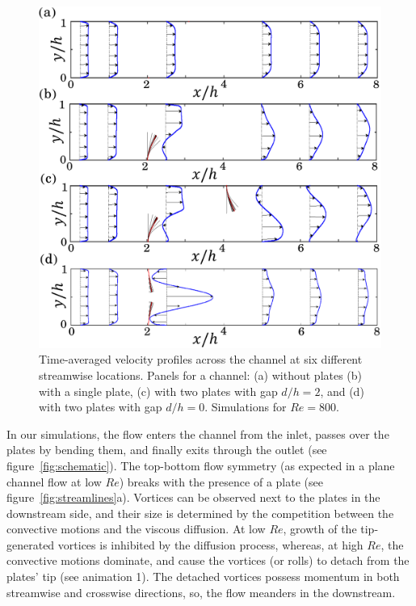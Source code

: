 \documentclass[aps,pre,twocolumn,aps,longbibliography]{revtex4-1}
\begin{document}
	\begin{figure}
		\begin{minipage}[c]{1\linewidth}
			\includegraphics[width=1\linewidth]{Fig10.pdf} 
		\end{minipage} 
		\caption{Time-averaged velocity profiles across the channel at six different streamwise locations. Panels for a channel: (a) without plates (b) with a single plate, (c) with two plates with gap $d/h=2$, and (d) with two plates with gap $d/h=0$. Simulations for $Re=800$.}
		\label{fig:vel_prof_timeavg}
	\end{figure}
	
	
	In our simulations, the flow enters the channel from the inlet, passes over the plates by bending them, and finally exits through the outlet (see figure~\ref{fig:schematic}). The top-bottom flow symmetry (as expected in a plane channel flow at low $Re$) breaks with the presence of a plate (see figure~\ref{fig:streamlines}a). Vortices can be observed next to the plates in the downstream side, and their size is determined by the competition between the convective motions and the viscous diffusion. At low $Re$, growth of the tip-generated vortices is inhibited by the diffusion process, whereas, at high $Re$, the convective motions dominate, and cause the vortices (or rolls) to detach from the plates' tip (see animation 1). The detached vortices possess momentum in both streamwise and crosswise directions, so, the flow meanders in the downstream.
	
\end{document}
